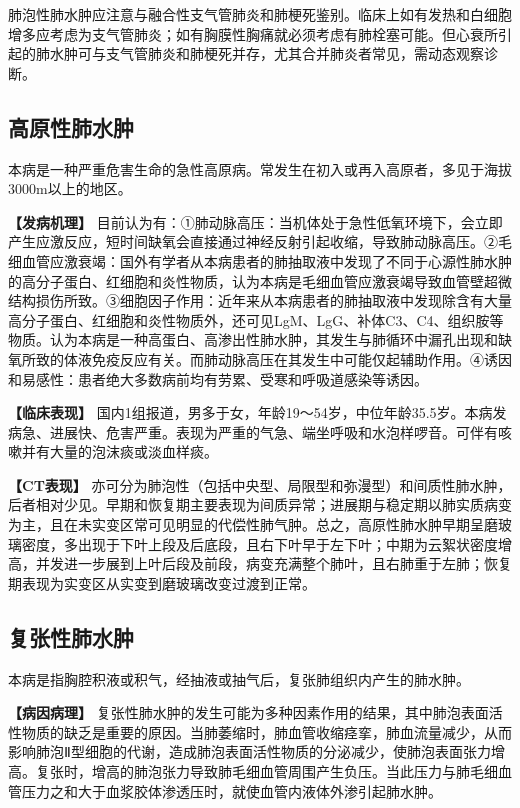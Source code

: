 肺泡性肺水肿应注意与融合性支气管肺炎和肺梗死鉴别。临床上如有发热和白细胞增多应考虑为支气管肺炎；如有胸膜性胸痛就必须考虑有肺栓塞可能。但心衰所引起的肺水肿可与支气管肺炎和肺梗死并存，尤其合并肺炎者常见，需动态观察诊断。

\subsection{高原性肺水肿}

本病是一种严重危害生命的急性高原病。常发生在初入或再入高原者，多见于海拔3000m以上的地区。

\textbf{【发病机理】}
目前认为有：①肺动脉高压：当机体处于急性低氧环境下，会立即产生应激反应，短时间缺氧会直接通过神经反射引起收缩，导致肺动脉高压。②毛细血管应激衰竭：国外有学者从本病患者的肺抽取液中发现了不同于心源性肺水肿的高分子蛋白、红细胞和炎性物质，认为本病是毛细血管应激衰竭导致血管壁超微结构损伤所致。③细胞因子作用：近年来从本病患者的肺抽取液中发现除含有大量高分子蛋白、红细胞和炎性物质外，还可见LgM、LgG、补体C3、C4、组织胺等物质。认为本病是一种高蛋白、高渗出性肺水肿，其发生与肺循环中漏孔出现和缺氧所致的体液免疫反应有关。而肺动脉高压在其发生中可能仅起辅助作用。④诱因和易感性：患者绝大多数病前均有劳累、受寒和呼吸道感染等诱因。

\textbf{【临床表现】}
国内1组报道，男多于女，年龄19～54岁，中位年龄35.5岁。本病发病急、进展快、危害严重。表现为严重的气急、端坐呼吸和水泡样啰音。可伴有咳嗽并有大量的泡沫痰或淡血样痰。

\textbf{【CT表现】}
亦可分为肺泡性（包括中央型、局限型和弥漫型）和间质性肺水肿，后者相对少见。早期和恢复期主要表现为间质异常；进展期与稳定期以肺实质病变为主，且在未实变区常可见明显的代偿性肺气肿。总之，高原性肺水肿早期呈磨玻璃密度，多出现于下叶上段及后底段，且右下叶早于左下叶；中期为云絮状密度增高，并发进一步展到上叶后段及前段，病变充满整个肺叶，且右肺重于左肺；恢复期表现为实变区从实变到磨玻璃改变过渡到正常。

\subsection{复张性肺水肿}

本病是指胸腔积液或积气，经抽液或抽气后，复张肺组织内产生的肺水肿。

\textbf{【病因病理】}
复张性肺水肿的发生可能为多种因素作用的结果，其中肺泡表面活性物质的缺乏是重要的原因。当肺萎缩时，肺血管收缩痉挛，肺血流量减少，从而影响肺泡Ⅱ型细胞的代谢，造成肺泡表面活性物质的分泌减少，使肺泡表面张力增高。复张时，增高的肺泡张力导致肺毛细血管周围产生负压。当此压力与肺毛细血管压力之和大于血浆胶体渗透压时，就使血管内液体外渗引起肺水肿。

